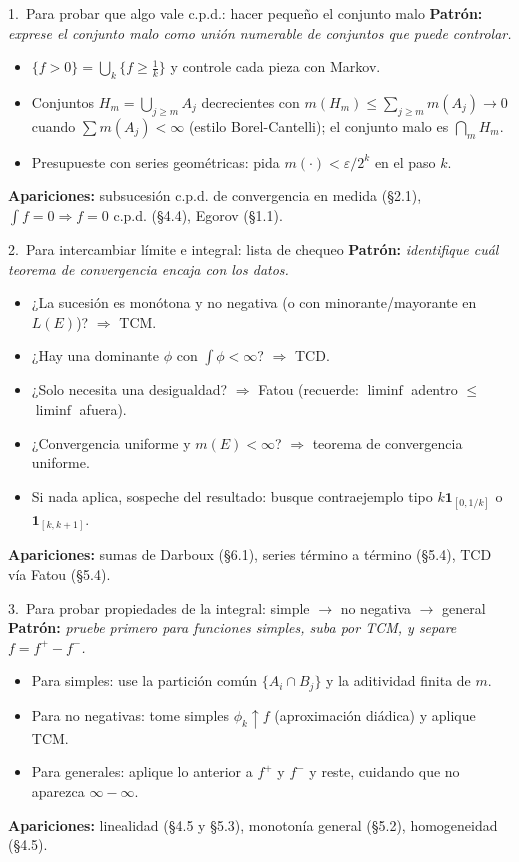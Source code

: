 \documentclass[11pt,twoside]{article}
\newcounter{result}[subsection]
\newcommand{\ind}{\mathbf{1}}
\begin{document}
\begin{strategybox}{1.\ Para probar que algo vale c.p.d.: hacer pequeño el conjunto malo}
\textbf{Patrón:} \textit{exprese el conjunto malo como unión numerable de conjuntos que puede controlar.}
\begin{itemize}[leftmargin=1.5em]
\item $\{f > 0\} = \bigcup_{k} \{f \geq \tfrac{1}{k}\}$ y controle cada pieza con Markov.
\item Conjuntos $H_{m} = \bigcup_{j \geq m} A_{j}$ decrecientes con $m(H_{m}) \leq \sum_{j \geq m} m(A_{j}) \to 0$ cuando $\sum m(A_{j}) < \infty$ (estilo Borel-Cantelli); el conjunto malo es $\bigcap_{m} H_{m}$.
\item Presupueste con series geométricas: pida $m(\cdot) < \varepsilon / 2^{k}$ en el paso $k$.
\end{itemize}
\textbf{Apariciones:} subsucesión c.p.d. de convergencia en medida (§2.1), $\int f = 0 \Rightarrow f = 0$ c.p.d. (§4.4), Egorov (§1.1).
\end{strategybox}

\begin{strategybox}{2.\ Para intercambiar límite e integral: lista de chequeo}
\textbf{Patrón:} \textit{identifique cuál teorema de convergencia encaja con los datos.}
\begin{itemize}[leftmargin=1.5em]
\item ¿La sucesión es monótona y no negativa (o con minorante/mayorante en $L(E)$)? $\Rightarrow$ TCM.
\item ¿Hay una dominante $\phi$ con $\int \phi < \infty$? $\Rightarrow$ TCD.
\item ¿Solo necesita una desigualdad? $\Rightarrow$ Fatou (recuerde: $\liminf$ adentro $\leq$ $\liminf$ afuera).
\item ¿Convergencia uniforme y $m(E) < \infty$? $\Rightarrow$ teorema de convergencia uniforme.
\item Si nada aplica, sospeche del resultado: busque contraejemplo tipo $k \ind_{[0,1/k]}$ o $\ind_{[k,k+1]}$.
\end{itemize}
\textbf{Apariciones:} sumas de Darboux (§6.1), series término a término (§5.4), TCD vía Fatou (§5.4).
\end{strategybox}

\begin{strategybox}{3.\ Para probar propiedades de la integral: simple $\to$ no negativa $\to$ general}
\textbf{Patrón:} \textit{pruebe primero para funciones simples, suba por TCM, y separe $f = f^{+} - f^{-}$.}
\begin{itemize}[leftmargin=1.5em]
\item Para simples: use la partición común $\{A_{i} \cap B_{j}\}$ y la aditividad finita de $m$.
\item Para no negativas: tome simples $\phi_{k} \uparrow f$ (aproximación diádica) y aplique TCM.
\item Para generales: aplique lo anterior a $f^{+}$ y $f^{-}$ y reste, cuidando que no aparezca $\infty - \infty$.
\end{itemize}
\textbf{Apariciones:} linealidad (§4.5 y §5.3), monotonía general (§5.2), homogeneidad (§4.5).
\end{strategybox}
\end{document}
